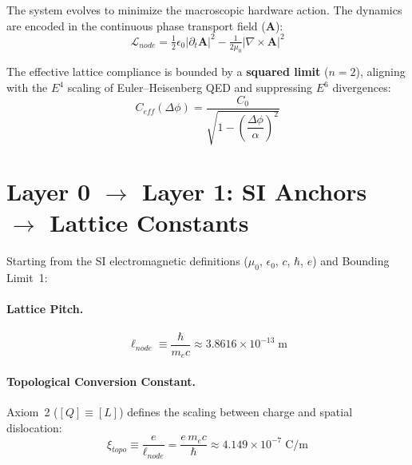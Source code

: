 \begin{axiom}
The system evolves to minimize the macroscopic hardware action. The dynamics
are encoded in the continuous phase transport field ($\mathbf{A}$):
\begin{equation}
    \mathcal{L}_{node} = \tfrac{1}{2}\epsilon_0 |\partial_t \mathbf{A}|^2
    - \tfrac{1}{2\mu_0} |\nabla \times \mathbf{A}|^2
    \label{eq:lagrangian}
\end{equation}
\end{axiom}

\begin{axiom}
The effective lattice compliance is bounded by a \textbf{squared limit}
($n=2$), aligning with the $E^4$ scaling of Euler--Heisenberg QED and
suppressing $E^6$ divergences:
\begin{equation}
    C_{eff}(\Delta\phi)
    = \frac{C_0}{\sqrt{1 - \left(\dfrac{\Delta\phi}{\alpha}\right)^{\!2}}}
    \label{eq:dielectric_saturation}
\end{equation}
\end{axiom}

\section{Layer 0 $\to$ Layer 1: SI Anchors $\to$ Lattice Constants}
\label{sec:layer01}

Starting from the SI electromagnetic definitions ($\mu_0$, $\epsilon_0$, $c$,
$\hbar$, $e$) and Bounding Limit~1:

\paragraph{Lattice Pitch.}
\begin{equation}
    \ell_{node} \equiv \frac{\hbar}{m_e c}
    \approx 3.8616 \times 10^{-13}\;\text{m}
    \label{eq:lnode}
\end{equation}

\paragraph{Topological Conversion Constant.}
Axiom~2 ($[Q] \equiv [L]$) defines the scaling between charge and spatial
dislocation:
\begin{equation}
    \xi_{topo} \equiv \frac{e}{\ell_{node}}
    = \frac{e \, m_e c}{\hbar}
    \approx 4.149 \times 10^{-7}\;\text{C/m}
    \label{eq:xi_topo}
\end{equation}

